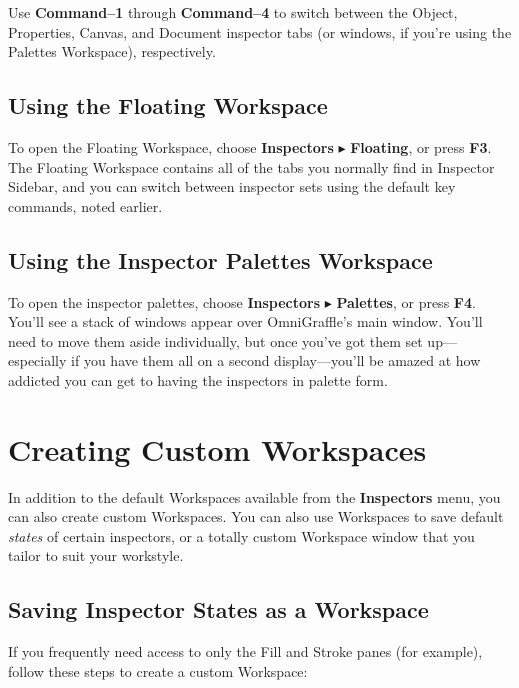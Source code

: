 \documentclass[../main.tex]{subfiles}
\begin{document}
Use \textbf{Command--1} through \textbf{Command--4} to switch between the Object, Properties,
Canvas, and Document inspector tabs (or windows, if you're using the Palettes Workspace),
respectively.

\subsection{Using the Floating Workspace}

To open the Floating Workspace, choose \textbf{Inspectors} $\blacktriangleright$
\textbf{Floating}, or press \textbf{F3}. The Floating Workspace contains all of the tabs you
normally find in Inspector Sidebar, and you can switch between inspector sets using the
default key commands, noted earlier.


\subsection{Using the Inspector Palettes Workspace}

To open the inspector palettes, choose \textbf{Inspectors} $\blacktriangleright$
\textbf{Palettes}, or press \textbf{F4}. You'll see a stack of windows appear over
OmniGraffle's main window. You'll need to move them aside individually, but once you've got
them set up---especially if you have them all on a second display---you'll be amazed at how
addicted you can get to having the inspectors in palette form.


\section{Creating Custom Workspaces}

In addition to the default Workspaces available from the \textbf{Inspectors} menu, you can also
create custom Workspaces. You can also use Workspaces to save default \textit{states} of
certain inspectors, or a totally custom Workspace window that you tailor to suit your
workstyle.

\subsection{Saving Inspector States as a Workspace}

If you frequently need access to only the Fill and Stroke panes (for example), follow these
steps to create a custom Workspace:
\end{document}
